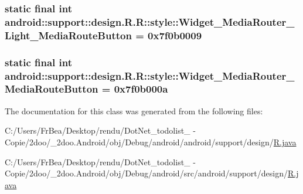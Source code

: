 \hypertarget{classandroid_1_1support_1_1design_1_1_r_1_1style_9853646df842e3694d3297eec2758c13}{
\subsubsection[{Widget\_\-MediaRouter\_\-Light\_\-MediaRouteButton}]{\setlength{\rightskip}{0pt plus 5cm}static final int android::support::design.R.R::style::Widget\_\-MediaRouter\_\-Light\_\-MediaRouteButton = 0x7f0b0009}}
\label{classandroid_1_1support_1_1design_1_1_r_1_1style_9853646df842e3694d3297eec2758c13}


\hypertarget{classandroid_1_1support_1_1design_1_1_r_1_1style_e7e1cef42c3f8201d49e921cf010151a}{
\subsubsection[{Widget\_\-MediaRouter\_\-MediaRouteButton}]{\setlength{\rightskip}{0pt plus 5cm}static final int android::support::design.R.R::style::Widget\_\-MediaRouter\_\-MediaRouteButton = 0x7f0b000a}}
\label{classandroid_1_1support_1_1design_1_1_r_1_1style_e7e1cef42c3f8201d49e921cf010151a}




The documentation for this class was generated from the following files:\begin{CompactItemize}
\item 
C:/Users/FrBea/Desktop/rendu/DotNet\_\-todolist\_ - Copie/2doo/\_\-2doo.Android/obj/Debug/android/android/support/design/\hyperlink{android_2support_2design_2_r_8java}{R.java}\item 
C:/Users/FrBea/Desktop/rendu/DotNet\_\-todolist\_ - Copie/2doo/\_\-2doo.Android/obj/Debug/android/src/android/support/design/\hyperlink{src_2android_2support_2design_2_r_8java}{R.java}\end{CompactItemize}
